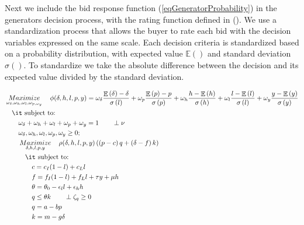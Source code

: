 \documentclass[informs]{informs3}
\begin{document}
Next we include the bid response function (\ref{eqGeneratorProbability}) in the generators decision process, with the rating function defined in (\label{eqBuyerObjective}). We use a standardization process that allows the buyer to rate each bid with the decision variables expressed on the same scale. Each decision criteria is standardized based on a probability distribution, with expected value ${\mathbb{E}()} $ and standard deviation ${\sigma\left(\right)}$. To standardize we take the absolute difference between the decision and its expected value divided by the standard deviation.


\begin{subequations}\label{eqBuyersProblem}
	\begin{align}
	&\mathop {Maximize}\limits_{\omega_{\delta},\omega_{h},\omega_{l},\omega_{p,\omega_{y}}}
	\quad \phi(\delta, h, l, p, y) =  	 \omega_{\delta}\frac{\mathop{\mathbb{E}}\left(\delta\right)-\delta }
	{\sigma\left(l\right)}+\omega_{p}\frac{\mathop{\mathbb{E}}\left(p\right)-p}  {\sigma\left(p\right)} 
	+\omega_{h}\frac{ h-\mathop{\mathbb{E}}\left(h\right)}
	{\sigma\left(h\right)}+\omega_{l}\frac{ l-\mathop{\mathbb{E}}\left(l\right) }{\sigma\left(l\right)}+\omega_{y}\frac{y-\mathop{\mathbb{E}}\left(y\right)}{\sigma\left(y\right)} \label{eqBuyerObjective}\\
	&\quad \mbox{{\it subject to}:}\notag\\
 	&\qquad	 \omega_{\delta}+\omega_{h}+\omega_{l}+\omega_{p}+\omega_{y}=1\label{eqBuyerNormal} \qquad \perp \nu\\
	&\qquad  \omega_{\delta},\omega_{h},\omega_{l},\omega_{p},\omega_{y} \geq 0;\\		
	&\qquad \mathop {Maximize}\limits_{\delta, h, l, p, y}
	\quad \rho(\delta, h, l,p,y)\left(\left(p-c\right)q+\left(\delta-f\right)k\right) \label{eqGeneratorObjective}\\ 
	&\qquad \quad \mbox{{\it subject to}:}\notag\\
	&\qquad \qquad c = c_I(1-l)+c_Ll \label{eqBuyerMarginalCost}\\
	&\qquad \qquad f = f_I(1-l)+f_Ll+\tau y+\mu h \label{eqBuyerFixedCost}\\
	&\qquad \qquad \theta = \theta_0-\epsilon_l l  +\epsilon_h h \label{eqBuyerTheta}\\
    &\qquad \qquad q \leq \theta k	\label{eqBuyerEnergySupply} 	\qquad \perp \zeta_q \geq 0\\
	&\qquad \qquad q = a - bp \label{eqBuyerEnergyDemand}\\	
	&\qquad \qquad k = m -g \delta \label{eqBuyerCapacityDemand}\\

\end{align}
\end{subequations}
\end{document}
